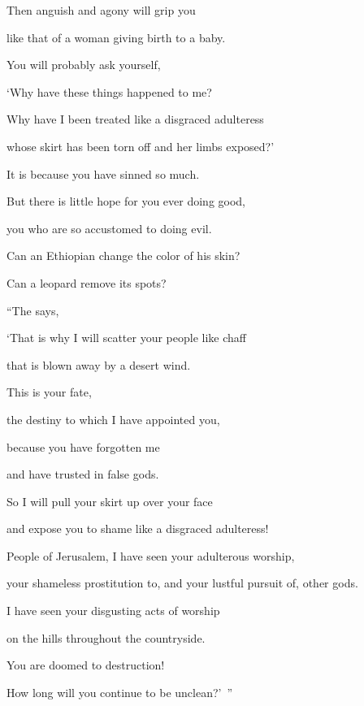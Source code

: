 {\par }{\Q Then anguish
and agony
will grip
you
\par }{\Q like
that of a woman
giving birth to a baby.
\par }{\Q {}You will probably
ask yourself,

\par }{\Q ‘Why have these
things happened
to me?
\par }{\Q Why
have I been treated like a disgraced adulteress
\par }{\Q whose skirt
has been torn off and her limbs
exposed?’

\par }{\Q It is because
you have sinned so much.
\par }{\Q {}But there is little hope for you ever doing good,
\par }{\Q you
who are so
accustomed
to doing evil.
\par }{\Q Can
an Ethiopian
change
the color of his skin?
\par }{\Q Can a leopard
remove
its spots?
\par }{\PP {}“The
{} says,

\par }{\Q ‘That is why I will scatter
your people like chaff
\par }{\Q that is blown
away by
a desert
wind.
\par }{\Q {}This
is your fate,
\par }{\Q the destiny
to which I
have appointed
you,
\par }{\Q because
you have forgotten
me
\par }{\Q and have trusted
in false gods.
\par }{\Q {}So
I
will pull
your skirt
up
over
your face
\par }{\Q and expose
you to shame like a disgraced adulteress!
\par }{\Q {}People of Jerusalem,
I have seen your adulterous
worship,
\par }{\Q your shameless
prostitution
to, and your lustful pursuit of, other gods.

\par }{\Q I have seen
your disgusting acts
of worship

\par }{\Q on
the hills
throughout the countryside.
\par }{\Q You are doomed
to destruction!

\par }{\Q How
long
will you continue
to be unclean?’ ”

}
